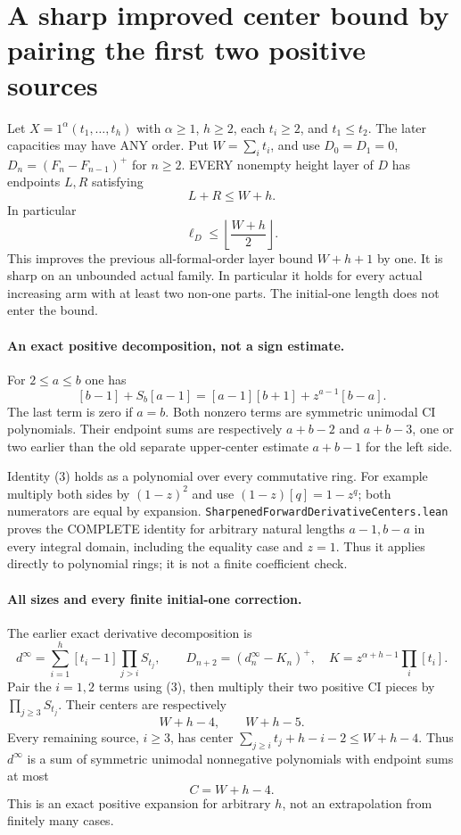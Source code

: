 \section{A sharp improved center bound by pairing the first two positive sources}
\begin{theorem}
Let $X=1^\alpha(t_1,\ldots,t_h)$ with $\alpha\ge1$, $h\ge2$,
each $t_i\ge2$, and $t_1\le t_2$. The later capacities may have
ANY order. Put $W=\sum_i t_i$, and use
$D_0=D_1=0$, $D_n=(F_n-F_{n-1})^+$ for $n\ge2$.
EVERY nonempty height layer of $D$ has endpoints $L,R$ satisfying
\[
                            L+R\le W+h.                 \tag{1}
\]
In particular
\[
                     \ell_D\le\left\lfloor\frac{W+h}{2}\right\rfloor.
                                                               \tag{2}
\]
This improves the previous all-formal-order layer bound $W+h+1$
by one. It is sharp on an unbounded actual family. In particular
it holds for every actual increasing arm with at least two
non-one parts. The initial-one length does not enter the bound.
\end{theorem}

\paragraph{An exact positive decomposition, not a sign estimate.}
For $2\le a\le b$ one has
\[
 [b-1]+S_b[a-1]
                  =[a-1][b+1]+z^{a-1}[b-a].              \tag{3}
\]
The last term is zero if $a=b$. Both nonzero terms are symmetric
unimodal CI polynomials. Their endpoint sums are respectively
$a+b-2$ and $a+b-3$, one or two earlier than the old separate
upper-center estimate $a+b-1$ for the left side.

Identity (3) holds as a polynomial over every commutative ring.
For example multiply both sides by $(1-z)^2$ and use
$(1-z)[q]=1-z^q$; both numerators are equal by expansion.
\texttt{SharpenedForwardDerivativeCenters.lean} proves the COMPLETE
identity for arbitrary natural lengths $a-1,b-a$ in every integral
domain, including the equality case and $z=1$. Thus it applies
directly to polynomial rings; it is not a finite coefficient check.

\paragraph{All sizes and every finite initial-one correction.}
The earlier exact derivative decomposition is
\[
 d^\infty=\sum_{i=1}^h[t_i-1]\prod_{j>i}S_{t_j},\qquad
 D_{n+2}=(d^\infty_n-K_n)^+,
 \quad K=z^{\alpha+h-1}\prod_i[t_i].                     \tag{4}
\]
Pair the $i=1,2$ terms using (3), then multiply their two
positive CI pieces by $\prod_{j\ge3}S_{t_j}$.
Their centers are respectively
\[
                       W+h-4,\qquad W+h-5.
\]
Every remaining source, $i\ge3$, has center
$\sum_{j\ge i}t_j+h-i-2\le W+h-4$.
Thus $d^\infty$ is a sum of symmetric unimodal nonnegative
polynomials with endpoint sums at most
\[
                              C=W+h-4.
\]
This is an exact positive expansion for arbitrary $h$, not an
extrapolation from finitely many cases.


